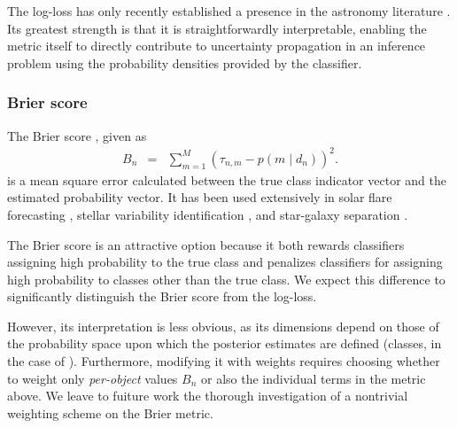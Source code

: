 The log-loss has only recently established a presence in the astronomy literature \citep{hon_deep_2017, hon_deep_2018}.
Its greatest strength is that it is straightforwardly interpretable, enabling the metric itself to directly contribute to uncertainty propagation in an inference problem using the probability densities provided by the classifier.

\subsubsection{Brier score}
\label{sec:brier}

The Brier score \cite{brier_verification_1950}, given as
\begin{eqnarray}
  \label{eq:brier}
B_{n} &=& \sum_{m=1}^{M}(\tau_{n, m}-p(m \mid d_{n}))^{2}.
\end{eqnarray}
is a mean square error calculated between the true class indicator vector and the estimated probability vector.
It has been used extensively in solar flare forecasting \cite{crown_validation, mays_ensemble_2015, florios_forecasting_2018}, stellar variability identification \citep{richards_construction_2012, armstrong_k2_2016}, and star-galaxy separation \citep{kim_hybrid_2015}.

The Brier score is an attractive option because it both rewards classifiers assigning high probability to the true class and penalizes classifiers for assigning high probability to classes other than the true class.
We expect this difference to significantly distinguish the Brier score from the log-loss.

However, its interpretation is less obvious, as its dimensions depend on those of the probability space upon which the posterior estimates are defined (classes, in the case of \plasticc).
Furthermore, modifying it with weights requires choosing whether to weight only \textit{per-object} values $B_{n}$ or also the individual terms in the metric above.
We leave to fuiture work the thorough investigation of a nontrivial weighting scheme on the Brier metric.


